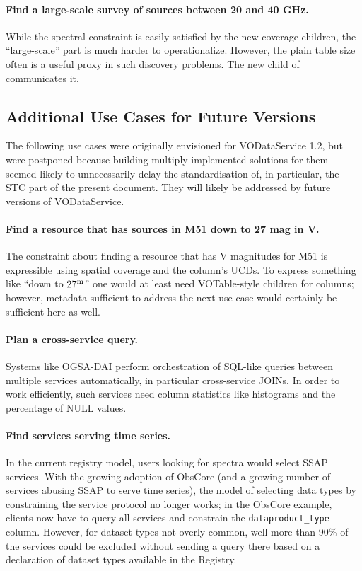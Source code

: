 \documentclass[11pt,a4paper]{ivoa}
\begin{document}
\paragraph{Find a large-scale survey of sources between 20 and 40 GHz.}
While the spectral constraint is easily satisfied by the new coverage
children, the ``large-scale'' part is much harder to operationalize.
However, the plain table size often is a useful proxy in such discovery
problems.  The new  child of  communicates
it.


\subsection{Additional Use Cases for Future Versions}

The following use cases were originally envisioned for VODataService
1.2, but were postponed because building multiply implemented solutions
for them seemed likely to unnecessarily delay the standardisation of, in
particular, the STC part of the present document.  They will likely be
addressed by future versions of VODataService.

\paragraph{Find a resource that has sources in M51 down to 27 mag in V.}
The constraint about finding a resource that has V magnitudes for M51 is
expressible using spatial coverage and the column's UCDs.  To express
something like ``down to $27^{\rm m}$'' one would at least need
VOTable-style  children for columns; however, metadata
sufficient to address the next use case would certainly be sufficient
here as well.

\paragraph{Plan a cross-service query.} Systems like OGSA-DAI
\citep{2011ASPC..442..579H} perform orchestration of SQL-like queries
between multiple services automatically, in particular cross-service
JOINs.  In order to work efficiently, such services need column
statistics like histograms and the percentage of NULL values.

\paragraph{Find services serving time series.} In the current registry
model, users looking for spectra would select SSAP services.  With the
growing adoption of ObsCore (and a growing number of services abusing
SSAP to serve time series), the model of selecting data types by
constraining the service protocol no longer works; in the ObsCore
example, clients now have to query all services and constrain the
\verb|dataproduct_type| column. However, for dataset types not overly
common, well more than 90\% of the services could be excluded without
sending a query there based on a declaration of dataset types available
in the Registry.
\end{document}
